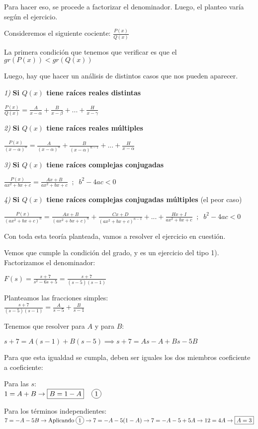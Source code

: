 \documentclass[11pt]{article}
\newcommand*\circled[1]{\tikz[baseline=(char.base)]{
		\node[shape=circle,draw,inner sep=2pt] (char) {#1};}}
\begin{document}
	Para hacer eso, se procede a factorizar el denominador. Luego, el planteo varía según el ejercicio.
	
	Consideremos el siguiente cociente: $\frac{P(x)}{Q(x)}$
	
	La primera condición que tenemos que verificar es que el \textbf{$gr(P(x)) < gr(Q(x))$}
	
	Luego, hay que hacer un análisis de distintos casos que nos pueden aparecer.
	
	\textit{1)} \textbf{Si $Q(x)$ tiene raíces reales distintas}
	
	$\displaystyle \frac{P(x)}{Q(x)}=\frac{A}{x-\alpha}+\frac{B}{x-\beta}+...+\frac{H}{x-\gamma}$
	
	\textit{2)} \textbf{Si $Q(x)$ tiene raíces reales múltiples}
	
	$\displaystyle \frac{P(x)}{(x-\alpha)^n}=\frac{A}{(x-\alpha)^{n}}+\frac{B}{(x-\alpha)^{n-1}}+...+\frac{H}{x-\alpha}$
	
	\textit{3)} \textbf{Si $Q(x)$ tiene raíces complejas conjugadas}
	
	$\displaystyle \frac{P(x)}{ax^2+bx+c}=\frac{Ax+B}{ax^2+bx+c} \;\; ; \; \; b^2-4ac<0$
	
	\textit{4)} \textbf{Si $Q(x)$ tiene raíces complejas conjugadas múltiples} (el peor caso)
	
	$\displaystyle \frac{P(x)}{(ax^2+bx+c)^n}=\frac{Ax+B}{(ax^2+bx+c)^n}+\frac{Cx+D}{(ax^2+bx+c)^{n-1}}+...+\frac{Hx+I}{ax^2+bx+c}\;\; ; \; \; b^2-4ac<0$
	
	Con toda esta teoría planteada, vamos a resolver el ejercicio en cuestión.
	
	Vemos que cumple la condición del grado, y es un ejercicio del tipo 1). Factorizamos el denominador:
	
	$\displaystyle F(s)=\frac{s+7}{s^2-6s+5}=\frac{s+7}{(s-5)(s-1)}$
	
	Planteamos las fracciones simples:
	\\ $\displaystyle \frac{s+7}{(s-5)(s-1)}=\frac{A}{s-5}+\frac{B}{s-1}$
	
	Tenemos que resolver para $A$ y para $B$:
	
	$s+7=A(s-1)+B(s-5) \implies s+7=As-A+Bs-5B$
	
	Para que esta igualdad se cumpla, deben ser iguales los dos miembros coeficiente a coeficiente:
	
	Para las $s$:\\
	$1=A+B \rightarrow \boxed{B=1-A} \;\;\;\; \circled{1}$
	
	Para los términos independientes:\\
	$7=-A-5B \rightarrow \mathrm{Aplicando\; \circled{1}} \rightarrow 7=-A-5(1-A)\rightarrow 7=-A-5+5A \rightarrow 12=4A \rightarrow \boxed{A=3}$
	
\end{document}

